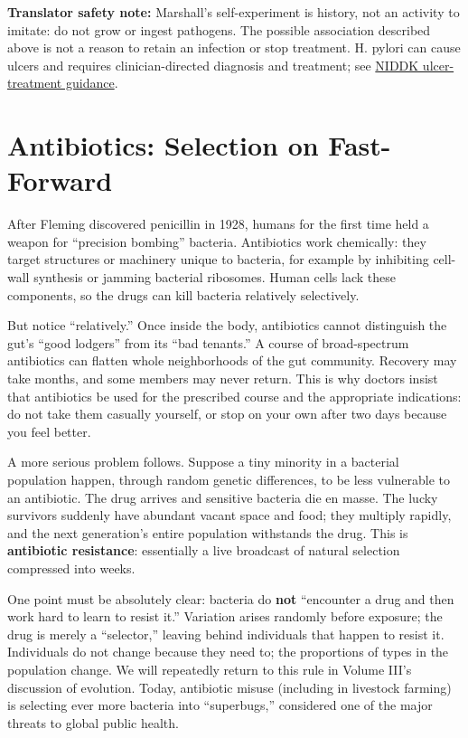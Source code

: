 \textbf{Translator safety note:} Marshall's self-experiment is history, not an activity to imitate: do not grow or ingest pathogens. The possible association described above is not a reason to retain an infection or stop treatment. H. pylori can cause ulcers and requires clinician-directed diagnosis and treatment; see \href{https://www.niddk.nih.gov/health-information/digestive-diseases/peptic-ulcers-stomach-ulcers/treatment}{NIDDK ulcer-treatment guidance}.

\section{Antibiotics: Selection on Fast-Forward}

After Fleming discovered penicillin in 1928, humans for the first time held a weapon for ``precision bombing'' bacteria. Antibiotics work chemically: they target structures or machinery unique to bacteria, for example by inhibiting cell-wall synthesis or jamming bacterial ribosomes. Human cells lack these components, so the drugs can kill bacteria relatively selectively.

But notice ``relatively.'' Once inside the body, antibiotics cannot distinguish the gut's ``good lodgers'' from its ``bad tenants.'' A course of broad-spectrum antibiotics can flatten whole neighborhoods of the gut community. Recovery may take months, and some members may never return. This is why doctors insist that antibiotics be used for the prescribed course and the appropriate indications: do not take them casually yourself, or stop on your own after two days because you feel better.

A more serious problem follows. Suppose a tiny minority in a bacterial population happen, through random genetic differences, to be less vulnerable to an antibiotic. The drug arrives and sensitive bacteria die en masse. The lucky survivors suddenly have abundant vacant space and food; they multiply rapidly, and the next generation's entire population withstands the drug. This is \textbf{antibiotic resistance}: essentially a live broadcast of natural selection compressed into weeks.

One point must be absolutely clear: bacteria do \textbf{not} ``encounter a drug and then work hard to learn to resist it.'' Variation arises randomly before exposure; the drug is merely a ``selector,'' leaving behind individuals that happen to resist it. Individuals do not change because they need to; the proportions of types in the population change. We will repeatedly return to this rule in Volume III's discussion of evolution. Today, antibiotic misuse (including in livestock farming) is selecting ever more bacteria into ``superbugs,'' considered one of the major threats to global public health.

